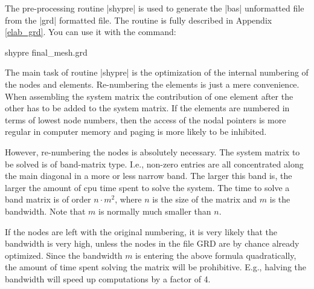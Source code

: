 
%
%
%
%
%
%
%

The pre-processing routine |shypre| is used to generate the
|bas| unformatted file from the |grd| formatted file. The routine is 
fully 
described in Appendix \ref{elab_grd}.
You can use it with the command:

\begin{code}
     shypre final_mesh.grd
\end{code}

The main task of routine |shypre| is the optimization of the 
internal numbering of the nodes and elements.
Re-numbering the elements is just a mere convenience. When
assembling the system matrix the contribution of
one element after the other has to be added to the system matrix.
If the elements are numbered in terms of lowest node numbers,
then the access of the nodal pointers is more regular in 
computer memory and paging is more likely to be inhibited.

However, re-numbering the nodes is absolutely necessary.
The system matrix to be solved is of band-matrix type.
I.e., non-zero entries are all concentrated along the
main diagonal in a more or less narrow band. The larger this
band is, the larger the amount of cpu time spent to
solve the system. The time to solve a band matrix
is of order $n \cdot m^2$, where $n$ is the size of the
matrix and $m$ is the bandwidth. Note that $m$ is normally
much smaller than $n$.

If the nodes are left with the original numbering, it is very likely
that the bandwidth is very high, unless the nodes in the
file GRD are by chance already optimized. Since the bandwidth $m$
is entering the above formula quadratically, the amount
of time spent solving the matrix will be prohibitive.
E.g., halving the bandwidth will speed up computations by
a factor of 4.


